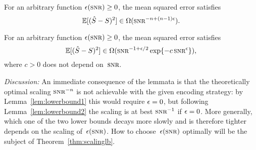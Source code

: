 \begin{lemma}
  \label{lem:lowerbound1}
  For an arbitrary function $\e(\snr) \ge 0$, the mean squared error satisfies
  \begin{equation*}
    \mse \in \Omega(\snr^{-n + (n-1)\e}).
  \end{equation*}
\end{lemma}

\begin{lemma}
  \label{lem:lowerbound2}
  For an arbitrary function $\e(\snr) \ge 0$, the mean squared error
  satisfies
  \begin{equation*}
    \mse \in \Omega(\snr^{-1+\e/2} \exp\{-c\snr^\e\}),
  \end{equation*}
  where $c>0$ does not depend on~$\snr$.
\end{lemma}

\emph{Discussion:} An immediate consequence of the lemmata is that the
theoretically optimal scaling $\snr^{-n}$ is not achievable with the given
encoding strategy: by Lemma~\ref{lem:lowerbound1} this would require $\epsilon = 0$,
but following Lemma~\ref{lem:lowerbound2} the scaling is at best $\snr^{-1}$ if
$\epsilon = 0 $.  More generally, which one of the two lower bounds decays more slowly
and is therefore tighter depends on the scaling of~$\e(\snr)$. How to
choose~$\e(\snr)$ optimally will be the subject of Theorem~\ref{thm:scalinglb}.

